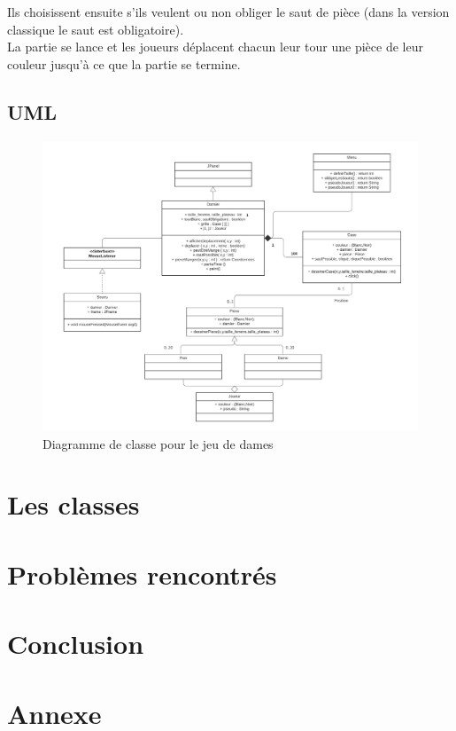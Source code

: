 \documentclass[12,french]{report}
\begin{document}
Ils choisissent ensuite s'ils veulent ou non obliger le saut de pièce (dans la version classique le saut est obligatoire).\\

La partie se lance et les joueurs déplacent chacun leur tour une pièce de leur couleur jusqu'à ce que la partie se termine.


\section{UML}

\begin{figure}[H]
	\center
	\includegraphics[width=1\textwidth]{./Images/UML}
	\caption{Diagramme de classe pour le jeu de dames}
\end{figure}\vspace{0.2cm}




\chapter{Les classes}

\chapter{Problèmes rencontrés}

\chapter*{Conclusion}

\chapter*{Annexe}
\end{document}
